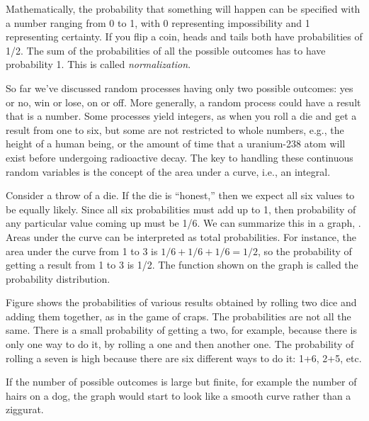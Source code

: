 Mathematically, the probability that something will happen can be specified with a number
ranging from 0 to 1, with 0 representing impossibility and 1 representing certainty.
If you flip a coin, heads and tails both have probabilities of 1/2.
The sum of the probabilities of all the possible outcomes has to have probability 1.
This is called \emph{normalization}.


So far we've discussed random processes having only two
possible outcomes: yes or no, win or lose, on or off. More
generally, a random process could have a result that is a
number. Some processes yield integers, as when you roll a
die and get a result from one to six, but some are not
restricted to whole numbers, e.g., the height of a human being, or
the amount of time that a uranium-238 atom will exist before undergoing radioactive decay.
The key to handling these continuous random variables is the concept of the area
under a curve, i.e., an integral.
%

Consider a throw of a die. If the die is ``honest,'' then we
expect all six values to be equally likely. Since all six
probabilities must add up to 1, then probability of any
particular value coming up must be 1/6. We can summarize
this in a graph, . Areas under the curve can be
interpreted as total probabilities. For instance, the area
under the curve from 1 to 3 is $1/6+1/6+1/6=1/2$, so the
probability of getting a result from 1 to 3 is 1/2. The
function shown on the graph is called the probability distribution.
%

Figure  shows the probabilities of various results
obtained by rolling two dice and adding them together, as in
the game of craps. The probabilities are not all the same.
There is a small probability of getting a two, for example,
because there is only one way to do it, by rolling a one and
then another one. The probability of rolling a seven is high
because there are six different ways to do it: 1+6, 2+5, etc.

If the number of possible outcomes is large but finite, for
example the number of hairs on a dog, the graph would start
to look like a smooth curve rather than a ziggurat.

